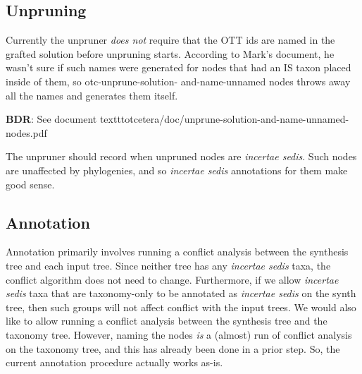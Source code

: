 \documentclass[english]{article}
\begin{document}
\subsection{Unpruning}

Currently the unpruner \emph{does not} require that the OTT ids are
named in the grafted solution before unpruning starts.
According to
Mark's document, he wasn't sure if such names were generated for nodes
that had an IS taxon placed inside of them, so otc-unprune-solution-
and-name-unnamed nodes throws away all the names and generates them
itself.

\textbf{BDR}: See document texttt{otcetera/doc/unprune-solution-and-name-unnamed-nodes.pdf}

The unpruner should record when unpruned nodes are \emph{incertae
sedis}.
Such nodes are unaffected by phylogenies, and so
\emph{incertae sedis} annotations for them make good sense.

\subsection{Annotation}

Annotation primarily involves running a conflict analysis between the
synthesis tree and each input tree.
Since neither tree has any
\emph{incertae sedis} taxa, the conflict algorithm does not need to
change.
Furthermore, if we allow \emph{incertae sedis} taxa that are
taxonomy-only to be annotated as \emph{incertae sedis} on the synth
tree, then such groups will not affect conflict with the input trees.
We would also like to allow running a conflict analysis between the
synthesis tree and the taxonomy tree.
However, naming the nodes
\emph{is} a (almost) run of conflict analysis on the taxonomy tree,
and this has already been done in a prior step.
So, the current
annotation procedure actually works as-is.
\end{document}
